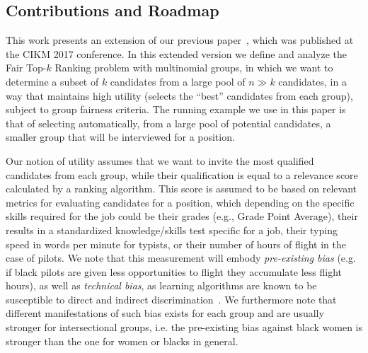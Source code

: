 \textcolor[rgb]{0.00,0.00,1.00}{\subsection{Contributions and Roadmap}}
\textcolor[rgb]{0.00,0.00,1.00}{This work presents an extension of our previous paper~\cite{zehlike2017fair}, which was published at the CIKM 2017 conference. In this extended version} we define and analyze the {\sc Fair Top-$k$ Ranking problem} with multinomial groups, in which we want to determine a subset of $k$ candidates from a large pool of $n \gg k$ candidates, in a way that maintains high utility (selects the ``best'' candidates from each group), subject to group fairness criteria.
%
The running example we use in this paper is that of selecting automatically, from a large pool of potential candidates, a smaller group that will be interviewed for a position.

Our notion of utility assumes that we want to invite the most qualified candidates from each group, while their qualification is equal to a relevance score calculated by a ranking algorithm.
%
This score is assumed to be based on relevant metrics for evaluating candidates for a position, which depending on the specific skills required for the job could be their grades (e.g., Grade Point Average), their results in a standardized knowledge/skills test specific for a job, their typing speed in words per minute for typists, or their number of hours of flight in the case of pilots.
%
We note that this measurement will embody \emph{pre-existing bias} (e.g. if black pilots are given less opportunities to flight they accumulate less flight hours), as well as \emph{technical bias}, as learning algorithms are known to be susceptible to direct and indirect discrimination~\cite{tuto2016,HajianFerrer12}.
%
We furthermore note that different manifestations of such bias exists for each group and are usually stronger for intersectional groups, i.e. the pre-existing bias against black women is stronger than the one for women or blacks in general.

